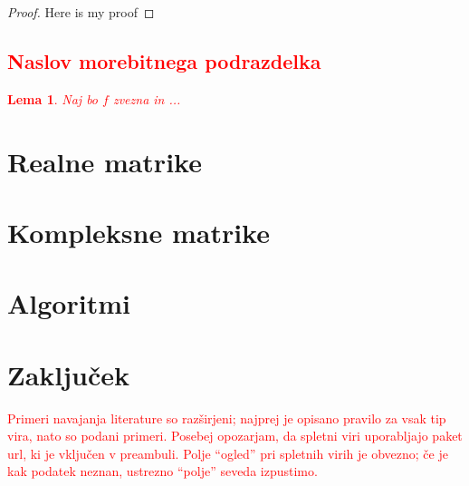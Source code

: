 \documentclass[12pt,a4paper]{amsart}
\theoremstyle{definition}
\theoremstyle{plain}
\newtheorem{lema}[definicija]{Lema}
\begin{document}
\begin{proof}
Here is my proof
\end{proof}

\subsection{\textcolor{Red}{Naslov morebitnega podrazdelka}}

\textcolor{Red}{\begin{lema}
Naj bo $f$ zvezna in ...
\end{lema}
}
\section{Realne matrike}
\section{Kompleksne matrike}
\section{Algoritmi}
\section{Zaključek}
\vfill

\textcolor{Red}{Primeri navajanja literature so razširjeni; najprej je opisano pravilo za vsak tip vira, nato so podani primeri. Posebej opozarjam, da spletni viri uporabljajo paket url, ki je vključen v preambuli. Polje ``ogled'' pri spletnih virih je obvezno; če je kak podatek neznan, ustrezno ``polje'' seveda izpustimo.}

\vfill
\end{document}
